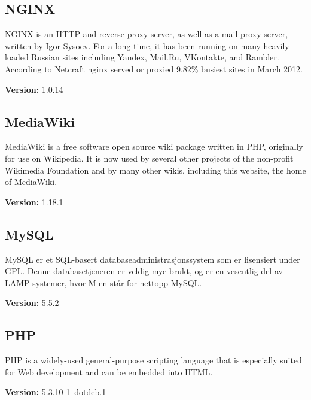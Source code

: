 \subsection{NGINX}
NGINX is an HTTP and reverse proxy server, as well as a mail proxy server, written by Igor Sysoev. For a long time, it has been running on many heavily loaded Russian sites including Yandex, Mail.Ru, VKontakte, and Rambler. According to Netcraft nginx served or proxied 9.82\% busiest sites in March 2012.\cite{nginx}
\begin{description}
\item{\textbf{Version: }}1.0.14
\end{description}
\subsection{MediaWiki}
MediaWiki is a free software open source wiki package written in PHP, originally for use on Wikipedia. It is now used by several other projects of the non-profit Wikimedia Foundation and by many other wikis, including this website, the home of MediaWiki.\cite{mediawiki}
\begin{description}
\item{\textbf{Version: }}1.18.1
\end{description}
\subsection{MySQL}
MySQL er et SQL-basert databaseadministrasjonssystem som er lisensiert under GPL. Denne databasetjeneren er veldig mye brukt, og er en vesentlig del av LAMP-systemer, hvor M-en står for nettopp MySQL.\cite{mysql}
\begin{description}
\item{\textbf{Version: }}5.5.2
\end{description}
\subsection{PHP}
PHP is a widely-used general-purpose scripting language that is especially suited for Web development and can be embedded into HTML.\cite{php}
\begin{description}
\item{\textbf{Version: }}5.3.10-1~dotdeb.1
\end{description}